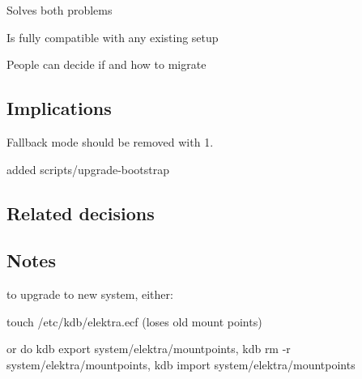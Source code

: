 \begin{DoxyItemize}
\item Solves both problems
\item Is fully compatible with any existing setup
\item People can decide if and how to migrate
\end{DoxyItemize}

\subsection*{Implications}


\begin{DoxyItemize}
\item Fallback mode should be removed with 1.
\item added scripts/upgrade-\/bootstrap
\end{DoxyItemize}

\subsection*{Related decisions}

\subsection*{Notes}

to upgrade to new system, either\+:


\begin{DoxyItemize}
\item touch /etc/kdb/elektra.ecf (loses old mount points)
\item or do kdb export system/elektra/mountpoints, kdb rm -\/r system/elektra/mountpoints, kdb import system/elektra/mountpoints 
\end{DoxyItemize}